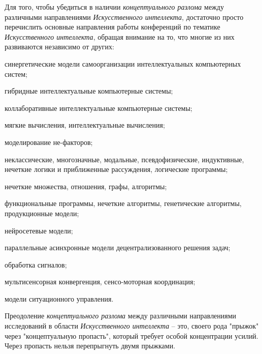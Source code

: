 Для того, чтобы убедиться в наличии \textit{концептуального разлома} между различными направлениями \textit{Искусственного интеллекта}, достаточно просто перечислить основные направления работы конференций по тематике \textit{Искусственного интеллекта}, обращая внимание на то, что многие из них развиваются независимо от других:

\begin{textitemize}
	\item
	синергетические модели самоорганизации интеллектуальных компьютерных систем;
	\item
	гибридные интеллектуальные компьютерные системы;
	\item
	коллаборативные интеллектуальные компьютерные системы;
	\item
	мягкие вычисления, интеллектуальные вычисления;
	\item
	моделирование не-факторов;
	\item
	неклассические, многозначные, модальные, псевдофизические, индуктивные, нечеткие логики и приближенные рассуждения, логические программы;
	\item
	нечеткие множества, отношения, графы, алгоритмы;
	\item
	функциональные программы, нечеткие алгоритмы, генетические алгоритмы, продукционные модели;
	\item
	нейросетевые модели;
	\item
	параллельные асинхронные модели децентрализованного решения задач;
	\item
	обработка сигналов;
	\item
	мультисенсорная конвергенция, сенсо-моторная координация;
	\item
	модели ситуационного управления.
\end{textitemize}

Преодоление \textit{концептуального разлома} между различными направлениями исследований в области \textit{Искусственного интеллекта} -- это, своего рода "прыжок"{} через "концептуальную пропасть"{}, который требует особой концентрации усилий. Через пропасть нельзя перепрыгнуть двумя прыжками.

